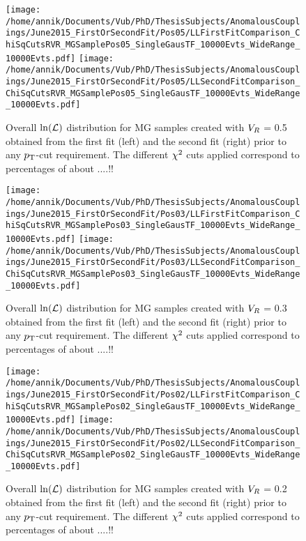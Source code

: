 \begin{figure}[h!t]
 \centering
 \texttt{[image: /home/annik/Documents/Vub/PhD/ThesisSubjects/AnomalousCouplings/June2015\_FirstOrSecondFit/Pos05/LLFirstFitComparison\_ChiSqCutsRVR\_MGSamplePos05\_SingleGausTF\_10000Evts\_WideRange\_10000Evts.pdf]}
 \texttt{[image: /home/annik/Documents/Vub/PhD/ThesisSubjects/AnomalousCouplings/June2015\_FirstOrSecondFit/Pos05/LLSecondFitComparison\_ChiSqCutsRVR\_MGSamplePos05\_SingleGausTF\_10000Evts\_WideRange\_10000Evts.pdf]}
 \caption{Overall $\ln(\mathcal{L})$ distribution for MG samples created with $V_{R}$ = 0.5 obtained from the first fit (left) and the second fit (right) prior to any $p_{\textrm T}$-cut requirement. The different $\chi^{2}$ cuts applied correspond to percentages of about ....!!} 
 \label{fig::FirstVsSecondFitPos05}
\end{figure}
\begin{figure}[h!t]
 \centering
 \texttt{[image: /home/annik/Documents/Vub/PhD/ThesisSubjects/AnomalousCouplings/June2015\_FirstOrSecondFit/Pos03/LLFirstFitComparison\_ChiSqCutsRVR\_MGSamplePos03\_SingleGausTF\_10000Evts\_WideRange\_10000Evts.pdf]}
 \texttt{[image: /home/annik/Documents/Vub/PhD/ThesisSubjects/AnomalousCouplings/June2015\_FirstOrSecondFit/Pos03/LLSecondFitComparison\_ChiSqCutsRVR\_MGSamplePos03\_SingleGausTF\_10000Evts\_WideRange\_10000Evts.pdf]}
 \caption{Overall $\ln(\mathcal{L})$ distribution for MG samples created with $V_{R}$ = 0.3 obtained from the first fit (left) and the second fit (right) prior to any $p_{\textrm T}$-cut requirement. The different $\chi^{2}$ cuts applied correspond to percentages of about ....!!} 
 \label{fig::FirstVsSecondFitPos03}
\end{figure}
\begin{figure}[h!t]
 \centering
 \texttt{[image: /home/annik/Documents/Vub/PhD/ThesisSubjects/AnomalousCouplings/June2015\_FirstOrSecondFit/Pos02/LLFirstFitComparison\_ChiSqCutsRVR\_MGSamplePos02\_SingleGausTF\_10000Evts\_WideRange\_10000Evts.pdf]}
 \texttt{[image: /home/annik/Documents/Vub/PhD/ThesisSubjects/AnomalousCouplings/June2015\_FirstOrSecondFit/Pos02/LLSecondFitComparison\_ChiSqCutsRVR\_MGSamplePos02\_SingleGausTF\_10000Evts\_WideRange\_10000Evts.pdf]}
 \caption{Overall $\ln(\mathcal{L})$ distribution for MG samples created with $V_{R}$ = 0.2 obtained from the first fit (left) and the second fit (right) prior to any $p_{\textrm T}$-cut requirement. The different $\chi^{2}$ cuts applied correspond to percentages of about ....!!} 
 \label{fig::FirstVsSecondFitPos02}
\end{figure}
